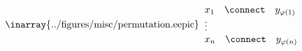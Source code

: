 
$
\makebox[200pt]{\inarray{../figures/misc/permutation.eepic}}
%
%
\begin{array}{l}
x_1 \quad\connect\quad y_{\varphi(1)}	\\
\vdots									\\
x_n \quad\connect\quad y_{\varphi(n)}
\end{array}
$

